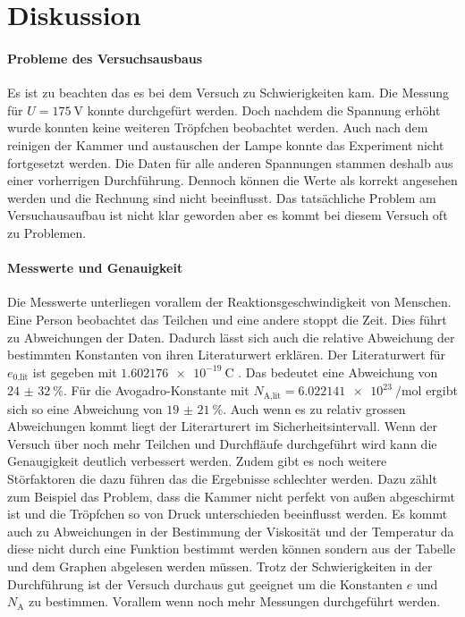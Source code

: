 \section{Diskussion}
\label{sec:Diskussion}
\paragraph*{Probleme des Versuchsausbaus}
Es ist zu beachten das es bei dem Versuch zu Schwierigkeiten kam.
Die Messung für $U=\qty{175}{\volt}$ konnte durchgefürt werden. Doch nachdem die Spannung erhöht wurde konnten keine weiteren Tröpfchen beobachtet werden.
Auch nach dem reinigen der Kammer und austauschen der Lampe konnte das Experiment nicht fortgesetzt werden. Die Daten für alle anderen Spannungen stammen deshalb aus einer vorherrigen Durchführung.
Dennoch können die Werte als korrekt angesehen werden und die Rechnung sind nicht beeinflusst.
Das tatsächliche Problem am Versuchausaufbau ist nicht klar geworden aber es kommt bei diesem Versuch oft zu Problemen.
\paragraph*{Messwerte und Genauigkeit}
Die Messwerte unterliegen vorallem der Reaktionsgeschwindigkeit von Menschen.
Eine Person beobachtet das Teilchen und eine andere stoppt die Zeit. Dies führt zu Abweichungen der Daten.
Dadurch lässt sich auch die relative Abweichung der bestimmten Konstanten von ihren Literaturwert erklären.
Der Literaturwert für $e_\text{0,lit}$ ist gegeben mit $\qty{1.602176e-19}{\coulomb}$ \cite[575]{Metzler}.
Das bedeutet eine Abweichung von $\qty{24(32)}{\percent}$. Für die Avogadro-Konstante mit $N_\text{A,lit}=\qty{6.022141e23}{\per\mole}$\cite[575]{Metzler} ergibt sich so eine Abweichung von $\qty{19(21)}{\percent}$.
Auch wenn es zu relativ grossen Abweichungen kommt liegt der Literarturert im Sicherheitsintervall.
Wenn der Versuch über noch mehr Teilchen und Durchfläufe durchgeführt wird kann die Genaugigkeit deutlich verbessert werden.
Zudem gibt es noch weitere Störfaktoren die dazu führen das die Ergebnisse schlechter werden.
Dazu zählt zum Beispiel das Problem, dass die Kammer nicht perfekt von außen abgeschirmt ist und die Tröpfchen so von Druck unterschieden beeinflusst werden.
Es kommt auch zu Abweichungen in der Bestimmung der Viskosität und der Temperatur da diese nicht durch eine Funktion bestimmt werden können sondern aus der Tabelle und dem Graphen abgelesen werden müssen.
Trotz der Schwierigkeiten in der Durchführung ist der Versuch durchaus gut geeignet um die Konstanten $e$ und $N_\text{A}$ zu bestimmen. Vorallem wenn noch mehr Messungen durchgeführt werden.




